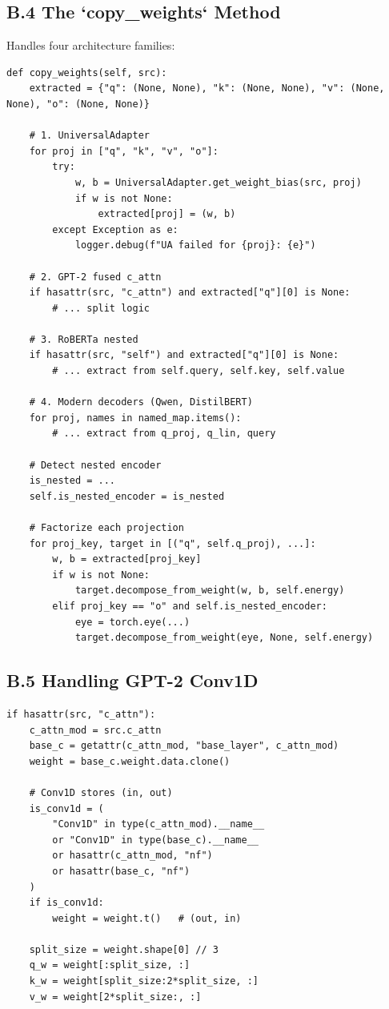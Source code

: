 \subsection{B.4 The `copy\_weights` Method}

Handles four architecture families:

\begin{lstlisting}
def copy_weights(self, src):
    extracted = {"q": (None, None), "k": (None, None), "v": (None, None), "o": (None, None)}
    
    # 1. UniversalAdapter
    for proj in ["q", "k", "v", "o"]:
        try:
            w, b = UniversalAdapter.get_weight_bias(src, proj)
            if w is not None:
                extracted[proj] = (w, b)
        except Exception as e:
            logger.debug(f"UA failed for {proj}: {e}")
    
    # 2. GPT-2 fused c_attn
    if hasattr(src, "c_attn") and extracted["q"][0] is None:
        # ... split logic
    
    # 3. RoBERTa nested
    if hasattr(src, "self") and extracted["q"][0] is None:
        # ... extract from self.query, self.key, self.value
    
    # 4. Modern decoders (Qwen, DistilBERT)
    for proj, names in named_map.items():
        # ... extract from q_proj, q_lin, query
    
    # Detect nested encoder
    is_nested = ...
    self.is_nested_encoder = is_nested
    
    # Factorize each projection
    for proj_key, target in [("q", self.q_proj), ...]:
        w, b = extracted[proj_key]
        if w is not None:
            target.decompose_from_weight(w, b, self.energy)
        elif proj_key == "o" and self.is_nested_encoder:
            eye = torch.eye(...)
            target.decompose_from_weight(eye, None, self.energy)
\end{lstlisting}

\subsection{B.5 Handling GPT-2 Conv1D}

\begin{lstlisting}
if hasattr(src, "c_attn"):
    c_attn_mod = src.c_attn
    base_c = getattr(c_attn_mod, "base_layer", c_attn_mod)
    weight = base_c.weight.data.clone()
    
    # Conv1D stores (in, out)
    is_conv1d = (
        "Conv1D" in type(c_attn_mod).__name__
        or "Conv1D" in type(base_c).__name__
        or hasattr(c_attn_mod, "nf")
        or hasattr(base_c, "nf")
    )
    if is_conv1d:
        weight = weight.t()   # (out, in)
    
    split_size = weight.shape[0] // 3
    q_w = weight[:split_size, :]
    k_w = weight[split_size:2*split_size, :]
    v_w = weight[2*split_size:, :]
\end{lstlisting}

